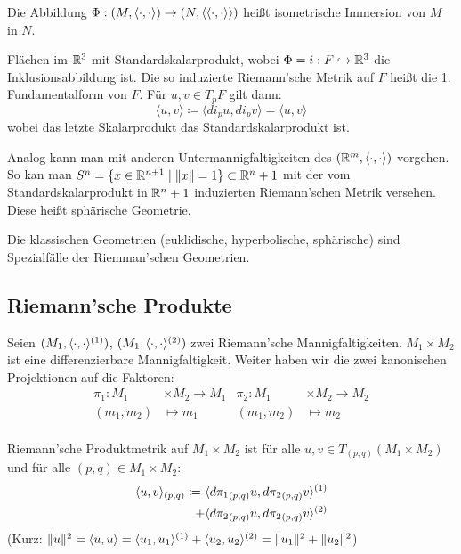 \documentclass[a4paper,twoside,DIV15,BCOR12mm]{scrbook}
\renewcommand{\da}{\coloneqq}
\begin{document}
Die Abbildung $\Phi: (M,\langle\cdot,\cdot\rangle) \to (N,\langle\langle\cdot,\cdot\rangle\rangle)$ heißt isometrische Immersion von $M$ in $N$.

\begin{beispiel}
Flächen im $\mathbb{R}^3$ mit Standardskalarprodukt, wobei $\Phi=i: F \hookrightarrow \mathbb{R}^3$ die Inklusionsabbildung ist. Die so induzierte Riemann’sche Metrik auf $F$ heißt die 1. Fundamentalform von $F$. Für $u,v \in T_pF$ gilt dann:
\[
\langle u,v\rangle \da \langle di_pu, di_pv\rangle = \langle u, v\rangle
\]
wobei das letzte Skalarprodukt das Standardskalarprodukt ist.
\end{beispiel}

Analog kann man mit anderen Untermannigfaltigkeiten des $(\mathbb{R}^m,\langle\cdot,\cdot\rangle)$ vorgehen. So kan man $S^n = \{x\in\mathbb{R}^{n+1}\mid \|x\|=1\}\subset \mathbb{R}^n+1$ mit der vom Standardskalarprodukt in $\mathbb{R}^n+1$ induzierten Riemann’schen Metrik versehen. Diese heißt sphärische Geometrie.

\begin{bemerkung}
Die klassischen Geometrien (euklidische, hyperbolische, sphärische) sind Spezialfälle der Riemman’schen Geometrien.
\end{bemerkung}

\subsection{Riemann’sche Produkte}
Seien $(M_1, \langle\cdot,\cdot\rangle^{(1)})$, $(M_1, \langle\cdot,\cdot\rangle^{(2)})$ zwei Riemann’sche Mannigfaltigkeiten. $M_1\times M_2$ ist eine differenzierbare Mannigfaltigkeit. Weiter haben wir die zwei kanonischen Projektionen auf die Faktoren:
\begin{align*}
\pi_1: M_1&\times M_2 \to M_1 &
\pi_2: M_1&\times M_2 \to M_2 \\
(m_1,m_2) &\mapsto m_1 &
(m_1,m_2) &\mapsto m_2 \\
\end{align*}

\begin{definition}
Riemann’sche Produktmetrik auf $M_1\times M_2$ ist für alle $u,v\in T_{(p,q)}(M_1\times M_2)$ und für alle $(p,q)\in M_1\times M_2$:
\begin{align*}
\ksp uv_{(p,q)} \da \ & \ksp {d{\pi_1}_{(p,q)} u}{ d{\pi_2}_{(p,q)}v}^{(1)} \\
+ &\ksp {d{\pi_2}_{(p,q)} u}{ d{\pi_2}_{(p,q)}v}^{(2)}
\end{align*}
(Kurz: $\|u\|^2 = \langle u,u\rangle = \langle u_1,u_1\rangle^{(1)} + \langle u_2,u_2\rangle^{(2)} = \|u_1\|^2 + \|u_2\|^2$)
\end{definition}
\end{document}
